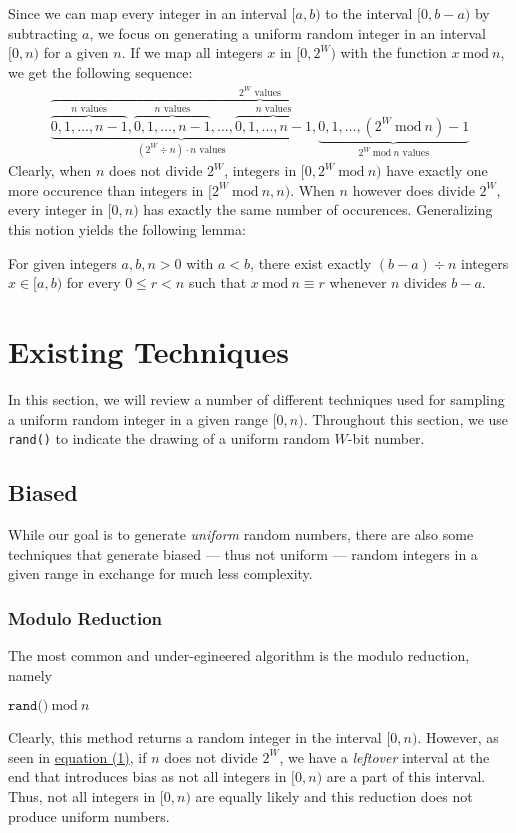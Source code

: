 \documentclass[a4paper, UKenglish, cleveref, autoref, thm-restate]{lipics-v2021}
\newcommand{\Mod}[1]{\ \mathrm{mod}\ #1}
\begin{document}
Since we can map every integer in an interval $[a,b)$ to the interval $[0,b - a)$ by subtracting $a$, we focus on generating a uniform random integer in an interval $[0,n)$ for a given $n$.
If we map all integers $x$ in $[0,2^W)$ with the function $x \Mod n$, we get the following sequence:
{\large
\begin{align}\label{eq:1}
    \overbrace{\underbrace{\overbrace{0,1,\ldots,n - 1}^{\text{$n$ values}},\overbrace{0,1,\ldots,n - 1}^{\text{$n$ values}},\ldots,\overbrace{0,1,\ldots,n - 1}^{\text{$n$ values}}}_{\text{$\left(2^W \div n\right) \cdot n$ values}},\underbrace{0,1,\ldots,\left(2^W \Mod n\right) - 1}_{\text{$2^W \Mod n$ values}}}^{\text{$2^W$ values}}
\end{align}
}%
Clearly, when $n$ does not divide $2^W$, integers in $[0,2^W \Mod n)$ have exactly one more occurence than integers in $[2^W \Mod n, n)$.
When $n$ however does divide $2^W$, every integer in $[0,n)$ has exactly the same number of occurences.
Generalizing this notion yields the following lemma:
\begin{lemma} \label{lemma:1}
    For given integers $a,b,n > 0$ with $a < b$, there exist exactly $(b - a) \div n$ integers $x \in [a,b)$ for every $0 \leq r < n$ such that $x \Mod n \equiv r$ whenever $n$ divides $b - a$.
\end{lemma}




\section{Existing Techniques}\label{sec:2}
In this section, we will review a number of different techniques used for sampling a uniform random integer in a given range $[0,n)$.
Throughout this section, we use \texttt{rand()} to indicate the drawing of a uniform random $W$-bit number.

\subsection{Biased}
While our goal is to generate \emph{uniform} random numbers, there are also some techniques that generate biased --- thus not uniform --- random integers in a given range in exchange for much less complexity.

\subsubsection{Modulo Reduction}\label{sec:2.1.1}
The most common and under-egineered algorithm is the modulo reduction, namely
\begin{center}
    $\texttt{rand()} \Mod n$
\end{center}
Clearly, this method returns a random integer in the interval $[0,n)$.
However, as seen in \hyperref[eq:1]{equation (1)}, if $n$ does not divide $2^W$, we have a \emph{leftover} interval at the end that introduces bias as not all integers in $[0,n)$ are a part of this interval.
Thus, not all integers in $[0,n)$ are equally likely and this reduction does not produce uniform numbers.
\end{document}
